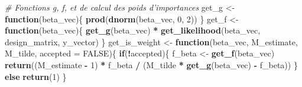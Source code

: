 \documentclass[]{article}
\newenvironment{Shaded}{\begin{snugshade}}{\end{snugshade}}
\newcommand{\CommentTok}[1]{\textcolor[rgb]{0.56,0.35,0.01}{\textit{#1}}}
\newcommand{\ControlFlowTok}[1]{\textcolor[rgb]{0.13,0.29,0.53}{\textbf{#1}}}
\newcommand{\DataTypeTok}[1]{\textcolor[rgb]{0.13,0.29,0.53}{#1}}
\newcommand{\DecValTok}[1]{\textcolor[rgb]{0.00,0.00,0.81}{#1}}
\newcommand{\KeywordTok}[1]{\textcolor[rgb]{0.13,0.29,0.53}{\textbf{#1}}}
\newcommand{\NormalTok}[1]{#1}
\newcommand{\OperatorTok}[1]{\textcolor[rgb]{0.81,0.36,0.00}{\textbf{#1}}}
\newcommand{\OtherTok}[1]{\textcolor[rgb]{0.56,0.35,0.01}{#1}}
\newcommand{\StringTok}[1]{\textcolor[rgb]{0.31,0.60,0.02}{#1}}
\begin{document}
\begin{Shaded}
\begin{Highlighting}[]
\CommentTok{# Fonctions g, f, et de calcul des poids d'importances}
\NormalTok{get_g <-}\StringTok{ }\ControlFlowTok{function}\NormalTok{(beta_vec)\{}
  \KeywordTok{prod}\NormalTok{(}\KeywordTok{dnorm}\NormalTok{(beta_vec, }\DecValTok{0}\NormalTok{, }\DecValTok{2}\NormalTok{))}
\NormalTok{\}}
\NormalTok{get_f <-}\StringTok{ }\ControlFlowTok{function}\NormalTok{(beta_vec)\{}
  \KeywordTok{get_g}\NormalTok{(beta_vec) }\OperatorTok{*}\StringTok{ }\KeywordTok{get_likelihood}\NormalTok{(beta_vec, design_matrix, y_vector)}
\NormalTok{\}}
\NormalTok{get_is_weight <-}\StringTok{ }\ControlFlowTok{function}\NormalTok{(beta_vec, M_estimate, M_tilde,}
                          \DataTypeTok{accepted =} \OtherTok{FALSE}\NormalTok{)\{}
  \ControlFlowTok{if}\NormalTok{(}\OperatorTok{!}\NormalTok{accepted)\{}
\NormalTok{    f_beta <-}\StringTok{ }\KeywordTok{get_f}\NormalTok{(beta_vec)}
    \KeywordTok{return}\NormalTok{((M_estimate }\OperatorTok{-}\StringTok{ }\DecValTok{1}\NormalTok{) }\OperatorTok{*}\StringTok{ }\NormalTok{f_beta }\OperatorTok{/}\StringTok{ }
\StringTok{             }\NormalTok{(M_tilde }\OperatorTok{*}\StringTok{ }\KeywordTok{get_g}\NormalTok{(beta_vec) }\OperatorTok{-}\StringTok{ }\NormalTok{f_beta))}
\NormalTok{  \}}
  \ControlFlowTok{else}
    \KeywordTok{return}\NormalTok{(}\DecValTok{1}\NormalTok{)}
\NormalTok{\}}
\end{Highlighting}
\end{Shaded}
\end{document}
